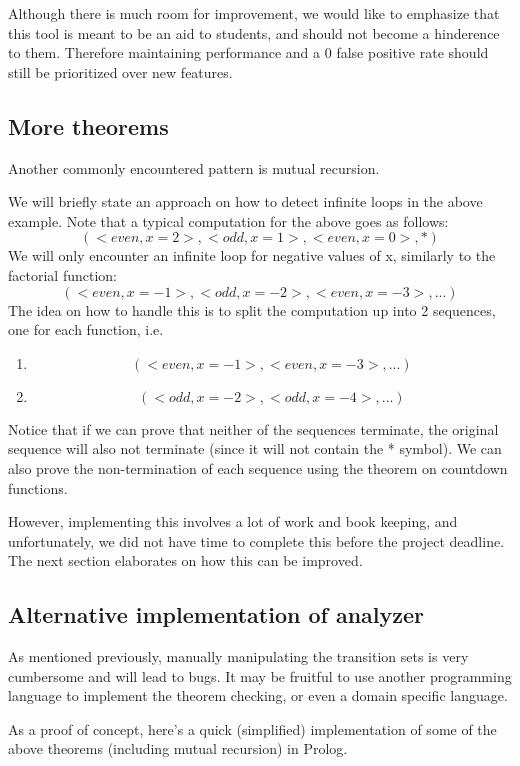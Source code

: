 Although there is much room for improvement, we would like to emphasize that this tool is meant to
be an aid to students, and should not become a hinderence to them. Therefore maintaining
performance and a 0 false positive rate should still be prioritized over new features.

\subsection{More theorems}
Another commonly encountered pattern is mutual recursion.

\begin{example}

\end{example}

We will briefly state an approach on how to detect infinite loops in the above example.
Note that a typical computation for the above goes as follows:
\[(<even, x=2>, <odd, x=1>, <even, x=0>, *)\]
We will only encounter an infinite loop for negative values of x, similarly to the factorial function:
\[(<even, x=-1>, <odd, x=-2>, <even, x=-3>, ...)\]
The idea on how to handle this is to split the computation up into 2 sequences, one for each function, i.e.
\begin{enumerate}
\item \[(<even, x=-1>, <even, x=-3>, ...)\]
\item \[(<odd, x=-2>, <odd, x=-4>, ...)\]
\end{enumerate}
Notice that if we can prove that neither of the sequences terminate, the original sequence will also not
terminate (since it will not contain the * symbol).
We can also prove the non-termination of each sequence using the theorem on countdown functions.

However, implementing this involves a lot of work and book keeping, and unfortunately, we did not have
time to complete this before the project deadline. The next section elaborates on how this can be improved.

\subsection{Alternative implementation of analyzer}
As mentioned previously, manually manipulating the transition sets is very cumbersome and will lead to bugs.
It may be fruitful to use another programming language to implement the theorem checking, or even
a domain specific language.

As a proof of concept, here's a quick (simplified) implementation of some of the above theorems (including
mutual recursion) in Prolog.

